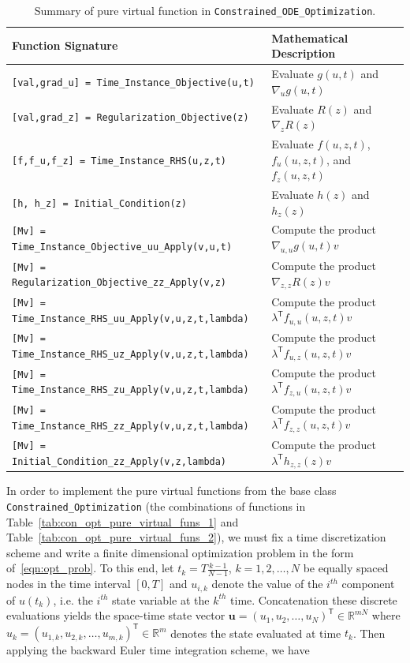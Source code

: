 \documentclass{article}
\renewcommand{\vec}[1] {\ensuremath{\boldsymbol{#1}}}
\def\R{{\mathbb R}}
\def\u{{\vec{u}}}
\newcommand{\trp}{^{\mathsf{T}}}
\begin{document}
\begin{table}[!ht]
\centering
\begin{tabular}{|l|l|}
    \hline
    Function Signature & Mathematical Description
    \\ \hline
    \texttt{[val,grad\_u] = Time\_Instance\_Objective(u,t)}
    & Evaluate $g(u,t)$ and $\nabla_u g(u,t)$
    \\
    \texttt{[val,grad\_z] = Regularization\_Objective(z)}
    & Evaluate $R(z)$ and $\nabla_z R(z)$
    \\
    \texttt{[f,f\_u,f\_z] = Time\_Instance\_RHS(u,z,t)}
    & Evaluate $f(u,z,t)$, $f_u(u,z,t)$, and $f_z(u,z,t)$
    \\
    \texttt{[h, h\_z] = Initial\_Condition(z)}
    & Evaluate $h(z)$ and $h_z(z)$
    \\
    \texttt{[Mv] = Time\_Instance\_Objective\_uu\_Apply(v,u,t)}
    & Compute the product $\nabla_{u,u} g(u,t) v$
    \\
    \texttt{[Mv] = Regularization\_Objective\_zz\_Apply(v,z)}
    & Compute the product $\nabla_{z,z} R(z) v$
    \\
    \texttt{[Mv] = Time\_Instance\_RHS\_uu\_Apply(v,u,z,t,lambda)}
    & Compute the product $\lambda\trp f_{u,u}(u,z,t) v$
    \\
    \texttt{[Mv]  = Time\_Instance\_RHS\_uz\_Apply(v,u,z,t,lambda)}
    & Compute the product $\lambda\trp f_{u,z}(u,z,t) v$
    \\
    \texttt{[Mv]  = Time\_Instance\_RHS\_zu\_Apply(v,u,z,t,lambda)}
    & Compute the product $\lambda\trp f_{z,u}(u,z,t) v$
    \\
    \texttt{[Mv]  = Time\_Instance\_RHS\_zz\_Apply(v,u,z,t,lambda)}
    & Compute the product $\lambda\trp f_{z,z}(u,z,t) v$
    \\
    \texttt{[Mv]  = Initial\_Condition\_zz\_Apply(v,z,lambda)}
    & Compute the product $\lambda\trp h_{z,z}(z) v$
    \\ \hline
\end{tabular}
\caption{Summary of pure virtual function in \texttt{Constrained\_ODE\_Optimization}.}
\label{tab:con_ode_opt_pure_virtual_funs_1}
\end{table}

In order to implement the pure virtual functions from the base class \texttt{Constrained\_Optimization} (the combinations of functions in Table~\ref{tab:con_opt_pure_virtual_funs_1} and Table~\ref{tab:con_opt_pure_virtual_funs_2}), we must fix a time discretization scheme and write a finite dimensional optimization problem in the form of~\eqref{eqn:opt_prob}. To this end, let $t_k=T\frac{k-1}{N-1}$, $k=1,2,\dots,N$ be equally spaced nodes in the time interval $[0,T]$ and $u_{i,k}$ denote the value of the $i^{th}$ component of $u(t_k)$, i.e. the $i^{th}$ state variable at the $k^{th}$ time. Concatenation these discrete evaluations yields the space-time state vector $\u=(u_1,u_2,\dots,u_N)\trp \in \R^{mN}$ where $u_k=(u_{1,k},u_{2,k},\dots,u_{m,k})\trp \in \R^{m}$ denotes the state evaluated at time $t_k$. Then applying the backward Euler time integration scheme, we have
\end{document}
